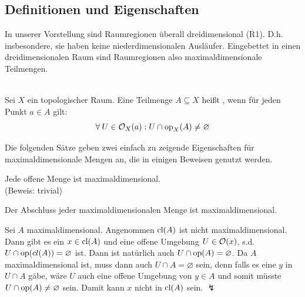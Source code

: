 \subsection{Definitionen und Eigenschaften}
    In
    unserer Vorstellung sind Raumregionen überall dreidimensional (R1). D.h. insbesondere, sie haben keine \glqq niederdimensionalen Ausläufer\grqq.
    Eingebettet in einen dreidimensionalen Raum sind Raumregionen also maximaldimensionale Teilmengen.
%
    \begin{dfn}[Maximaldimensional]\label{def:maxdim}\ \\
        Sei $X$ ein topologischer Raum. Eine Teilmenge $A \subseteq X$ heißt , wenn für jeden Punkt $a \in A$ gilt:
        $$\forall\: U \in \mathcal{O}_X(a) : U \cap \text{op}_X(A) \neq \varnothing$$ 
    \end{dfn}
%    
%    
    Die folgenden Sätze geben zwei einfach zu zeigende Eigenschaften für maximaldimensionale Mengen an, die in einigen Beweisen genutzt werden.
%
    \begin{satz}\label{satz:offen-maxdim}
        Jede offene Menge ist maximaldimensional.\\
        (Beweis: trivial)
    \end{satz}
%    
%    
    \begin{satz}\label{satz:abschluss-maxdim}
        Der Abschluss jeder maximaldimensionalen Menge ist maximaldimensional.
    \end{satz}
%    
    \begin{bew}
        Sei $A$ maximaldimensional. 
        Angenommen $\text{cl}(A)$ ist nicht maximaldimensional.
        Dann gibt es ein $x \in \text{cl}(A)$ und eine offene Umgebung $U \in \mathcal{O}(x)$, s.d. $U \cap \text{op}(cl(A)) = \varnothing$ ist.
        Dann ist natürlich auch $U \cap \text{op}(A) = \varnothing$.
        Da $A$ maximaldimensional ist, muss dann auch $U \cap A = \varnothing$ sein, denn falls es eine $y$ in $U \cap A$ gäbe, wäre $U$ auch eine offene Umgebung von $y \in A$ und somit müsste $U \cap \text{op}(A) \neq \varnothing$ sein.
        Damit kann $x$ nicht in $\text{cl}(A)$ sein. 
        $\lightning$
    \end{bew}
